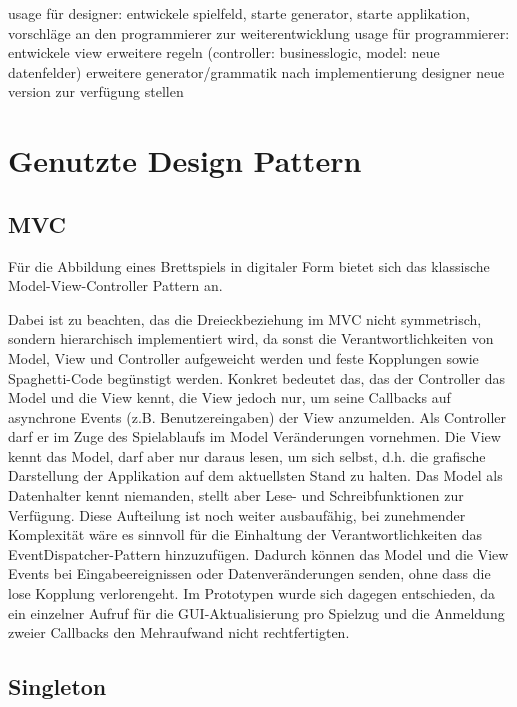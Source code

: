\documentclass[conference]{IEEEtran}
\begin{document}
  usage f\"ur designer: entwickele spielfeld, starte generator, starte applikation,
    vorschl\"age an den programmierer zur weiterentwicklung
  usage f\"ur programmierer:
    entwickele view 
    erweitere regeln (controller: businesslogic, model: neue datenfelder)
    erweitere generator/grammatik
    nach implementierung designer neue version zur verf\"ugung stellen



\section{Genutzte Design Pattern}
\subsection{MVC}
  F\"ur die Abbildung eines Brettspiels in digitaler Form bietet sich das klassische Model-View-Controller Pattern an.

  Dabei ist zu beachten, das die Dreieckbeziehung im MVC nicht symmetrisch, sondern hierarchisch implementiert wird, da sonst die Verantwortlichkeiten
  von Model, View und Controller aufgeweicht werden und feste Kopplungen sowie Spaghetti-Code beg\"unstigt werden. Konkret bedeutet das, das der Controller das Model und die View kennt, die View jedoch nur, um seine Callbacks auf asynchrone Events (z.B. Benutzereingaben) der View anzumelden. Als Controller darf er im Zuge des Spielablaufs im Model Ver\"anderungen vornehmen. Die View kennt das Model, darf aber nur daraus lesen, um sich selbst, d.h. die grafische Darstellung der Applikation auf dem aktuellsten Stand zu halten. Das Model als Datenhalter kennt niemanden, stellt aber Lese- und Schreibfunktionen zur Verf\"ugung. Diese Aufteilung ist noch weiter ausbauf\"ahig, bei zunehmender Komplexit\"at w\"are es sinnvoll f\"ur die
  Einhaltung der Verantwortlichkeiten das EventDispatcher-Pattern hinzuzuf\"ugen. Dadurch k\"onnen das Model und die View Events bei Eingabeereignissen oder Datenver\"anderungen senden, ohne dass die lose Kopplung verlorengeht. Im Prototypen wurde sich dagegen entschieden, da ein einzelner Aufruf f\"ur die GUI-Aktualisierung pro Spielzug und die Anmeldung zweier Callbacks den Mehraufwand nicht rechtfertigten.

\subsection{Singleton}
\end{document}
